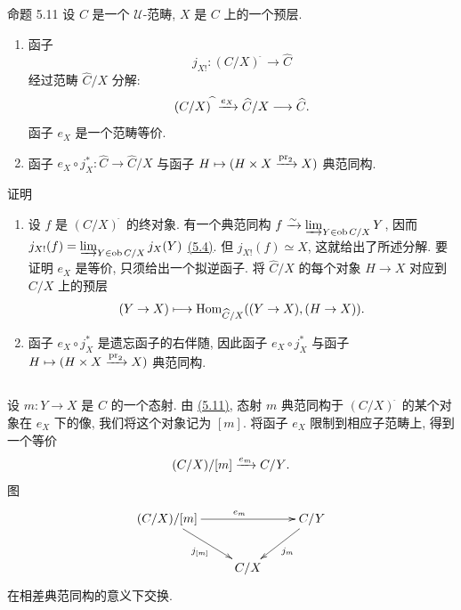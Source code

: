 \begin{enonce*}{命题 5.11}
设 $C$ 是一个 $𝒰$-范畴, $X$ 是 $C$ 上的一个预层.
\begin{enumerate}
\renewcommand{\labelenumi}{\theenumi)}
\item 函子
$$
j_{X!}:(C/X)^{\widehat{\phantom{,}}}\longrightarrow
\widehat{C}
$$
经过范畴 $\widehat{C}/X$ 分解:
$$
(C/X)^{\widehat{\phantom{,}}}\xrightarrow{e_X}
\widehat{C}/X\longrightarrow
\widehat{C}{}.
$$
函子 $e_X$ 是一个范畴等价.

\item 函子 $e_{X}\circ j^\ast_X:\widehat{C}
\to  \widehat{C}/X$ 与函子
$H\mapsto (H\times X \xrightarrow{\operatorname{pr}_2} X)$ 典范同构.
\end{enumerate}
\end{enonce*}

\begin{enonce*}[remark]{证明}
\begin{enumerate}
\renewcommand{\labelenumi}{\theenumi)}
\item 设 $f$ 是 $(C/X)^{\widehat{\phantom{,}}}$ 的终对象.
有一个典范同构 $f\xrightarrow{\sim}
\varinjlim_{Y\in \operatorname{ob} C/X}Y$, 因而
$j_{X!}(f)=\varinjlim_{Y\in \operatorname{ob} C/X}j_X(Y)$ \hyperref[I.prop5.4]{(5.4)}.
但 $j_{X!}(f)\simeq X$, 这就给出了所述分解.
要证明 $e_X$ 是等价, 只须给出一个拟逆函子.
将 $\widehat{C}/X$ 的每个对象 $H\rightarrow X$ 对应到 $C/X$ 上的预层
$$
(Y\rightarrow X)\longmapsto
  \operatorname{Hom}_{\widehat{C}/X}((Y\rightarrow X), (H\rightarrow
  X)){}.
$$

\item 函子 $e_X\circ j^\ast_X$ 是遗忘函子的右伴随,
因此函子 $e_X\circ j^\ast_X$ 与函子 $H\mapsto (H\times
  X\xrightarrow{\operatorname{pr}_2}X)$ 典范同构.
\end{enumerate}
\end{enonce*}

\setcounter{subsection}{11}
\subsection{}
设 $m:Y\rightarrow X$ 是 $\widehat{C}$ 的一个态射.
由 \hyperref[I.prop5.11]{(5.11)}, 态射 $m$ 典范同构于
$(C/X)^{\widehat{\phantom{,}}}$ 的某个对象在 $e_X$ 下的像,
我们将这个对象记为 $[m]$. 将函子 $e_X$ 限制到相应子范畴上, 得到一个等价
$$
(C/X)/[m]\xrightarrow{e_m}C/Y{}.
$$
图\pageoriginale
\[
\xymatrix{
  (C/X)/[m]\ar[rr]^{e_m} \ar[rd]_{j_{[m]}} &       & C/Y \ar[ld]^{j_m}\\
          & C/X   &
}
\]
在相差典范同构的意义下交换.

